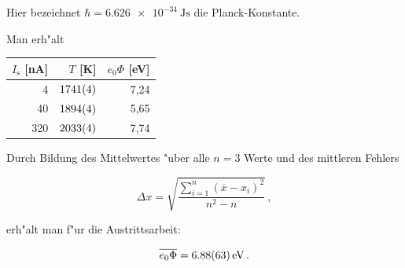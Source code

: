 		Hier bezeichnet $\hbar = \SI{6.626e-34}{\joule \second}$ \cite{nist} die Planck-Konstante.

		Man erh"alt

		\begin{table}[h!]
			\begin{center}
				\label{messung1}
				\begin{tabular}{|r|r|r|}
					\hline
						$I_\mathrm{s}$ [nA] & $T$ [K] & $e_0 \Phi$ [eV] \\
					\hline 
					\hline
						4 & $\SI{1741 (4)}{}$ & 7,24\\
						40 & $\SI{1894 (4)}{}$ & 5,65 \\
						320 & $\SI{2033 (4)}{}$ & 7,74 \\
					\hline 
				\end{tabular}
			\end{center}
		\end{table}

		\clearpage

		Durch Bildung des Mittelwertes "uber alle $n = 3$ Werte und des mittleren Fehlers

		\begin{equation*}
			\Delta x = \sqrt{\frac{\sum_{i=1}^{n}{\left(\overline{x} - x_i\right)^2}}{n^2 - n}}\,,
		\end{equation*}

		erh"alt man f"ur die Austrittsarbeit:

		\begin{eqnarray*}
			\overline{e_0 \Phi} = \SI{6.88 (63)}{\electronvolt}\,.
		\end{eqnarray*}

